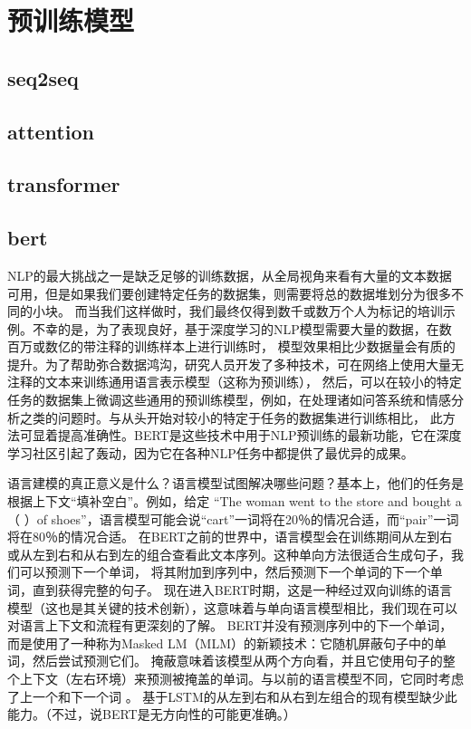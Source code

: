 \section{预训练模型}
\subsection{seq2seq}
\subsection{attention}
\subsection{transformer}
\subsection{bert}
NLP的最大挑战之一是缺乏足够的训练数据，从全局视角来看有大量的文本数据可用，但是如果我们要创建特定任务的数据集，则需要将总的数据堆划分为很多不同的小块。
而当我们这样做时，我们最终仅得到数千或数万个人为标记的培训示例。不幸的是，为了表现良好，基于深度学习的NLP模型需要大量的数据，在数百万或数亿的带注释的训练样本上进行训练时，
模型效果相比少数据量会有质的提升。为了帮助弥合数据鸿沟，研究人员开发了多种技术，可在网络上使用大量无注释的文本来训练通用语言表示模型（这称为预训练），
然后，可以在较小的特定任务的数据集上微调这些通用的预训练模型，例如，在处理诸如问答系统和情感分析之类的问题时。与从头开始对较小的特定于任务的数据集进行训练相比，
此方法可显着提高准确性。BERT是这些技术中用于NLP预训练的最新功能，它在深度学习社区引起了轰动，因为它在各种NLP任务中都提供了最优异的成果。

语言建模的真正意义是什么？语言模型试图解决哪些问题？基本上，他们的任务是根据上下文“填补空白”。例如，给定
“The woman went to the store and bought a（ ）of shoes”，语言模型可能会说“cart”一词将在20％的情况合适，而“pair”一词将在80％的情况合适。
在BERT之前的世界中，语言模型会在训练期间从左到右或从左到右和从右到左的组合查看此文本序列。这种单向方法很适合生成句子，我们可以预测下一个单词，
将其附加到序列中，然后预测下一个单词的下一个单词，直到获得完整的句子。
现在进入BERT时期，这是一种经过双向训练的语言模型（这也是其关键的技术创新），这意味着与单向语言模型相比，我们现在可以对语言上下文和流程有更深刻的了解。
BERT并没有预测序列中的下一个单词，而是使用了一种称为Masked LM（MLM）的新颖技术：它随机屏蔽句子中的单词，然后尝试预测它们。
掩蔽意味着该模型从两个方向看，并且它使用句子的整个上下文（左右环境）来预测被掩盖的单词。与以前的语言模型不同，它同时考虑了上一个和下一个词 。
基于LSTM的从左到右和从右到左组合的现有模型缺少此能力。（不过，说BERT是无方向性的可能更准确。）

